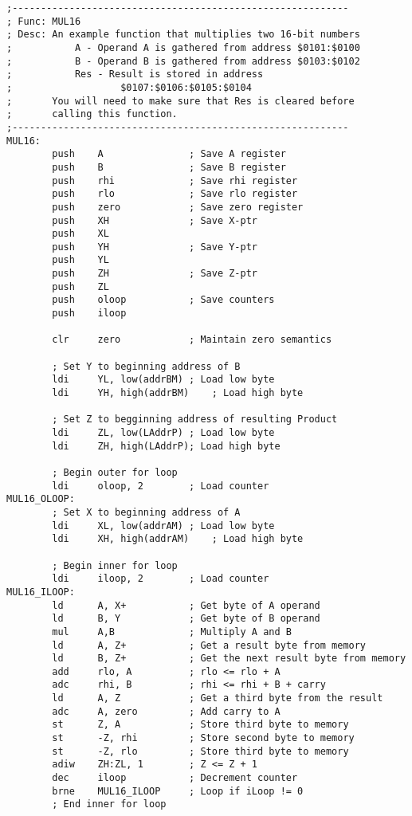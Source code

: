 \documentclass[12pt,letterpaper]{article}
\begin{document}
\begin{verbatim}
;-----------------------------------------------------------
; Func: MUL16
; Desc: An example function that multiplies two 16-bit numbers
;           A - Operand A is gathered from address $0101:$0100
;           B - Operand B is gathered from address $0103:$0102
;           Res - Result is stored in address
;                   $0107:$0106:$0105:$0104
;       You will need to make sure that Res is cleared before
;       calling this function.
;-----------------------------------------------------------
MUL16:
        push    A               ; Save A register
        push    B               ; Save B register
        push    rhi             ; Save rhi register
        push    rlo             ; Save rlo register
        push    zero            ; Save zero register
        push    XH              ; Save X-ptr
        push    XL
        push    YH              ; Save Y-ptr
        push    YL
        push    ZH              ; Save Z-ptr
        push    ZL
        push    oloop           ; Save counters
        push    iloop

        clr     zero            ; Maintain zero semantics

        ; Set Y to beginning address of B
        ldi     YL, low(addrBM) ; Load low byte
        ldi     YH, high(addrBM)    ; Load high byte

        ; Set Z to begginning address of resulting Product
        ldi     ZL, low(LAddrP) ; Load low byte
        ldi     ZH, high(LAddrP); Load high byte

        ; Begin outer for loop
        ldi     oloop, 2        ; Load counter
MUL16_OLOOP:
        ; Set X to beginning address of A
        ldi     XL, low(addrAM) ; Load low byte
        ldi     XH, high(addrAM)    ; Load high byte

        ; Begin inner for loop
        ldi     iloop, 2        ; Load counter
MUL16_ILOOP:
        ld      A, X+           ; Get byte of A operand
        ld      B, Y            ; Get byte of B operand
        mul     A,B             ; Multiply A and B
        ld      A, Z+           ; Get a result byte from memory
        ld      B, Z+           ; Get the next result byte from memory
        add     rlo, A          ; rlo <= rlo + A
        adc     rhi, B          ; rhi <= rhi + B + carry
        ld      A, Z            ; Get a third byte from the result
        adc     A, zero         ; Add carry to A
        st      Z, A            ; Store third byte to memory
        st      -Z, rhi         ; Store second byte to memory
        st      -Z, rlo         ; Store third byte to memory
        adiw    ZH:ZL, 1        ; Z <= Z + 1
        dec     iloop           ; Decrement counter
        brne    MUL16_ILOOP     ; Loop if iLoop != 0
        ; End inner for loop


\end{verbatim}
\end{document}
